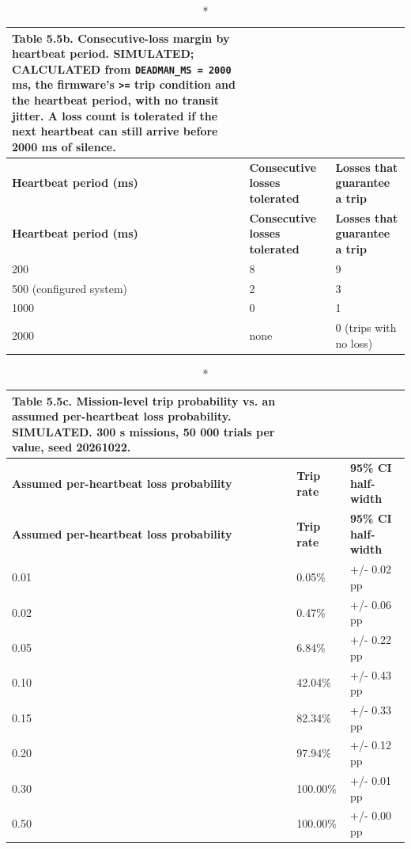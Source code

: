 \begin{center}
\begin{longtable}{|l|l|l|}
\caption*{Table 5.5b. Consecutive-loss margin by heartbeat period. SIMULATED; CALCULATED from \texttt{DEADMAN\_MS = 2000} ms, the firmware's \texttt{>=} trip condition and the heartbeat period, with no transit jitter. A loss count is tolerated if the next heartbeat can still arrive before 2000 ms of silence.}
\addcontentsline{lot}{table}{\protect\numberline{5.5b}Consecutive-loss margin by heartbeat period. SIMULATED; CALCULATED from \texttt{DEADMAN\_MS = 2000} ms, the firmware's \texttt{>=} trip condition and the heartbeat period, with no transit jitter. A loss count is tolerated if the next heartbeat can still arrive before 2000 ms of silence.}
\\
\hline
\textbf{Heartbeat period (ms)} & \textbf{Consecutive losses tolerated} & \textbf{Losses that guarantee a trip} \\
\hline
\endfirsthead
\hline
\textbf{Heartbeat period (ms)} & \textbf{Consecutive losses tolerated} & \textbf{Losses that guarantee a trip} \\
\hline
\endhead
200 & 8 & 9 \\
\hline
500 (configured system) & 2 & 3 \\
\hline
1000 & 0 & 1 \\
\hline
2000 & none & 0 (trips with no loss) \\
\hline
\end{longtable}
\end{center}

\begin{center}
\begin{longtable}{|l|l|l|}
\caption*{Table 5.5c. Mission-level trip probability vs. an assumed per-heartbeat loss probability. SIMULATED. 300 s missions, 50 000 trials per value, seed 20261022.}
\addcontentsline{lot}{table}{\protect\numberline{5.5c}Mission-level trip probability vs. an assumed per-heartbeat loss probability. SIMULATED. 300 s missions, 50 000 trials per value, seed 20261022.}
\\
\hline
\textbf{Assumed per-heartbeat loss probability} & \textbf{Trip rate} & \textbf{95\% CI half-width} \\
\hline
\endfirsthead
\hline
\textbf{Assumed per-heartbeat loss probability} & \textbf{Trip rate} & \textbf{95\% CI half-width} \\
\hline
\endhead
0.01 & 0.05\% & +/- 0.02 pp \\
\hline
0.02 & 0.47\% & +/- 0.06 pp \\
\hline
0.05 & 6.84\% & +/- 0.22 pp \\
\hline
0.10 & 42.04\% & +/- 0.43 pp \\
\hline
0.15 & 82.34\% & +/- 0.33 pp \\
\hline
0.20 & 97.94\% & +/- 0.12 pp \\
\hline
0.30 & 100.00\% & +/- 0.01 pp \\
\hline
0.50 & 100.00\% & +/- 0.00 pp \\
\hline
\end{longtable}
\end{center}

